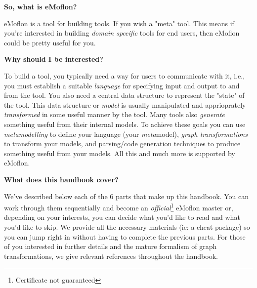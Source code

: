 {\bf \large So, what is eMoflon?}

eMoflon is a tool for building tools.  If you wish a "meta" tool.  This means if you're interested in building \emph{domain specific} tools for end users, then eMoflon could be pretty useful for you.


{\bf \large Why should I be interested?}

To build a tool, you typically need a way for users to communicate with it, i.e., you must establish a suitable \emph{language} for specifying input and output to and from the tool.  You also need a central data structure to represent the "state" of the tool.  This data structure or \emph{model} is usually manipulated and apprioprately \emph{transformed} in some useful manner by the tool.  Many tools also \emph{generate} something useful from their internal models.  To achieve these goals you can use \emph{metamodelling} to define your language (your \emph{meta}model), \emph{graph transformations} to transform your models, and parsing/code generation techniques to produce something useful from your models. All this and much more is supported by eMoflon.


{\bf \large What does this handbook cover?}

We've described below each of the 6 parts that make up this handbook. You can work through them sequentially and become an \emph{official}\footnote{Certificate not guaranteed} eMoflon master or, depending on your interests, you can decide what you'd like to read and what you'd like to skip. We provide all the necessary materials (ie: a cheat package) so you can jump right in without having to complete the previous parts. For those of you interested in further details and the mature formalism of graph transformations, we give relevant references throughout the handbook.

\pagebreak

